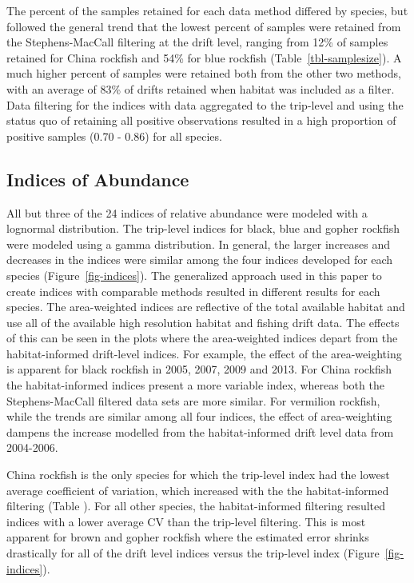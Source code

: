 \documentclass[
  12pt,
  authoryear,
  preprint,
  3p]{elsarticle}
\begin{document}
The percent of the samples retained for each data method differed by
species, but followed the general trend that the lowest percent of
samples were retained from the Stephens-MacCall filtering at the drift
level, ranging from 12\% of samples retained for China rockfish and 54\%
for blue rockfish (Table~\ref{tbl-samplesize}). A much higher percent of
samples were retained both from the other two methods, with an average
of 83\% of drifts retained when habitat was included as a filter. Data
filtering for the indices with data aggregated to the trip-level and
using the status quo of retaining all positive observations resulted in
a high proportion of positive samples (0.70 - 0.86) for all species.

\hypertarget{indices-of-abundance-1}{%
\subsection{Indices of Abundance}\label{indices-of-abundance-1}}

All but three of the 24 indices of relative abundance were modeled with
a lognormal distribution. The trip-level indices for black, blue and
gopher rockfish were modeled using a gamma distribution. In general, the
larger increases and decreases in the indices were similar among the
four indices developed for each species (Figure~\ref{fig-indices}). The
generalized approach used in this paper to create indices with
comparable methods resulted in different results for each species. The
area-weighted indices are reflective of the total available habitat and
use all of the available high resolution habitat and fishing drift data.
The effects of this can be seen in the plots where the area-weighted
indices depart from the habitat-informed drift-level indices. For
example, the effect of the area-weighting is apparent for black rockfish
in 2005, 2007, 2009 and 2013. For China rockfish the habitat-informed
indices present a more variable index, whereas both the Stephens-MacCall
filtered data sets are more similar. For vermilion rockfish, while the
trends are similar among all four indices, the effect of area-weighting
dampens the increase modelled from the habitat-informed drift level data
from 2004-2006.

China rockfish is the only species for which the trip-level index had
the lowest average coefficient of variation, which increased with the
the habitat-informed filtering (Table \citet{tab-avgcv}). For all other
species, the habitat-informed filtering resulted indices with a lower
average CV than the trip-level filtering. This is most apparent for
brown and gopher rockfish where the estimated error shrinks drastically
for all of the drift level indices versus the trip-level index
(Figure~\ref{fig-indices}).
\end{document}
